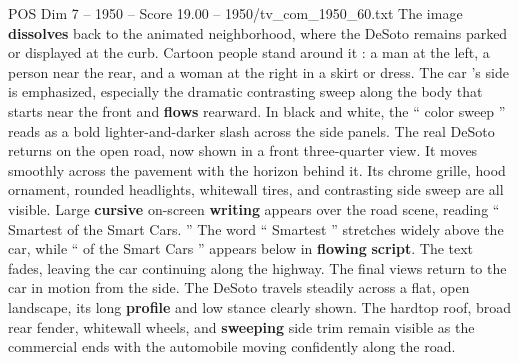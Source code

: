 \begin{textsample}{POS Dim 7 – 1950 – Score 19.00 – 1950/tv\_com\_1950\_60.txt}
The image \textbf{dissolves} back to the animated neighborhood, where the DeSoto remains parked or displayed at the curb.
Cartoon people stand around it : a man at the left, a person near the rear, and a woman at the right in a skirt or dress.
The car ’s side is emphasized, especially the dramatic contrasting sweep along the body that starts near the front and \textbf{flows} rearward.
In black and white, the “ color sweep ” reads as a bold lighter-and-darker slash across the side panels.
The real DeSoto returns on the open road, now shown in a front three-quarter view.
It moves smoothly across the pavement with the horizon behind it.
Its chrome grille, hood ornament, rounded headlights, whitewall tires, and contrasting side sweep are all visible.
Large \textbf{cursive} on-screen \textbf{writing} appears over the road scene, reading “ Smartest of the Smart Cars. ” The word “ Smartest ” stretches widely above the car, while “ of the Smart Cars ” appears below in \textbf{flowing} \textbf{script}.
The text fades, leaving the car continuing along the highway.
The final views return to the car in motion from the side.
The DeSoto travels steadily across a flat, open landscape, its long \textbf{profile} and low stance clearly shown.
The hardtop roof, broad rear fender, whitewall wheels, and \textbf{sweeping} side trim remain visible as the commercial ends with the automobile moving confidently along the road.

\end{textsample}
